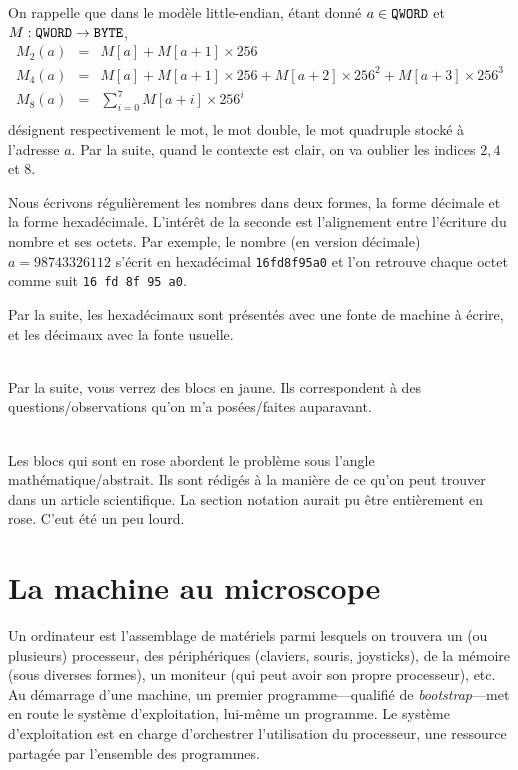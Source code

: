 \documentclass{book}
\newenvironment{commentaire}[1]{%
	\def\FrameCommand{\fboxrule=\FrameRule\fboxsep=\FrameSep \fcolorbox{yellow!50}{yellow!10}}%
	\MakeFramed {\advance\hsize-\width \FrameRestore}
	\noindent {\bf #1}\\
}%
{\endMakeFramed}
\newenvironment{formalisme}[1]{%
	\def\FrameCommand{\fboxrule=\FrameRule\fboxsep=\FrameSep \fcolorbox{red!10}{red!5}}%
	\MakeFramed {\advance\hsize-\width \FrameRestore}
	\noindent {\bf #1}\\
}%
{\endMakeFramed}
\newcommand{\hexa}[1]{{\tt #1}}
\newcommand{\BYTE}{{\tt BYTE}}
\newcommand{\QWORD}{{\tt QWORD}}
\begin{document}
On rappelle que dans le modèle little-endian, étant donné $a\in \QWORD$ et $M: \QWORD\to \BYTE$, $$\begin{array}{rcl}
M_2(a) &=& M[a] + M[a+1] \times 256\\
M_4(a) &=& M[a] + M[a+1]\times 256 + M[a+2]\times 256^{2} +M[a+3]\times 256^{3} \\
M_8(a) &=& \sum_{i = 0}^7 M[a+i] \times {256}^{i}\\
\end{array}$$
désignent respectivement le mot, le mot double, le mot quadruple stocké à l'adresse $a$. Par la suite, quand le contexte est clair, on va oublier les indices $2, 4$ et $8$. 

Nous écrivons régulièrement les nombres dans deux formes, la forme décimale et la forme hexadécimale. L'intérêt de la seconde est l'alignement entre l'écriture du nombre et ses octets. Par exemple, le nombre (en version décimale) $a = 98743326112$ s'écrit en hexadécimal   \hexa{16fd8f95a0} et l'on retrouve chaque octet comme suit \hexa{16 fd 8f 95 a0}. 
 
 Par la suite, les hexadécimaux sont présentés avec une fonte de machine à écrire, et les décimaux avec la fonte usuelle. 
 

\begin{commentaire}{Questions/observations}
	Par la suite, vous verrez des blocs en jaune. Ils correspondent à des questions/observations qu'on m'a posées/faites auparavant. 
\end{commentaire}

\begin{formalisme}{Formalisme}
	Les blocs qui sont en rose abordent le problème sous l'angle mathématique/abstrait. Ils sont rédigés à la manière de ce qu'on peut trouver dans un article scientifique. La section notation aurait pu être entièrement en rose. C'eut été un peu lourd.
\end{formalisme}


\chapter{La machine au microscope}

Un ordinateur est l'assemblage de matériels parmi lesquels on trouvera un (ou plusieurs) processeur, des périphériques (claviers, souris, joysticks), de la mémoire (sous diverses formes), un moniteur (qui peut avoir son propre processeur), etc. Au démarrage d'une machine, un premier programme---qualifié de \emph{bootstrap}---met en route le système d'exploitation, lui-même un programme. Le système d'exploitation est en charge d'orchestrer l'utilisation du processeur, une ressource partagée par l'ensemble des programmes. 
\end{document}
